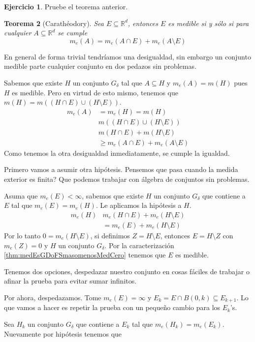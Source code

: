 \documentclass[12pt]{article}
\theoremstyle{plain}
\newtheorem{Th}{Teorema}[subsection]   %
\theoremstyle{definition}
\newtheorem{Ej}[Th]{Ejercicio}
\theoremstyle{remark}
\numberwithin{equation}{section}
\newcommand{\bR}{\mathbb{R}}        %
\renewcommand{\geq}{\geqslant}      %
\renewcommand{\:}{\colon}           %
\begin{document}
\begin{multicols}{2}
\begin{Ej}
  Pruebe el teorema anterior.
\end{Ej}

\begin{Th}[Carathéodory]
  Sea $E\subseteq\bR^d$, entonces $E$ es medible si y sólo si para cualquier $A\subseteq\bR^d$ se cumple
  $$m_e(A)=m_e(A\cap E)+m_e(A\setminus E)$$
\end{Th}
En general de forma trivial tendríamos una desigualdad, sin embargo un conjunto medible parte cualquier conjunto en dos pedazos sin problemas.

\begin{ptcbp}
Sabemos que existe $H$ un conjunto $G_\delta$ tal que $A\subseteq H$ y $m_e(A)=m(H)$ pues $H$ es medible. Pero en virtud de esto mismo, tenemos que $m(H)=m((H\cap E)\cup (H\setminus E))$.
\begin{align*}
  m_e(A) &=m_e(H)=m(H)\\
  &m((H\cap E)\cup (H\setminus E))\\
  &m(H\cap E)+m(H\setminus E)\\
  &\geq m_e(A\cap E)+m_e(A\setminus E)
\end{align*}
Como tenemos la otra desigualdad inmediatamente, se cumple la igualdad.\par
Primero vamos a asumir otra hipótesis. Pensemos que pasa cuando la medida exterior es finita? Que podemos trabajar con álgebra de conjuntos sin problemas.\par
Asuma que $m_e(E)<\infty$, sabemos que existe $H$ un conjunto $G_\delta$ que contiene a $E$ tal que $m_e(E)=m_e(H)$. Le aplicamos la hipótesis a $H$.
\begin{align*}
  m_e(H) & m_e(H\cap E)+m_e(H\setminus E)\\
  &= m_e(E)+m_e(H\setminus E)
\end{align*}
Por lo tanto $0=m_e(H\setminus E)$, si definimos $Z=H\setminus E$, entonces $E=H\setminus Z$ con $m_e(Z)=0$ y $H$ un conjunto $G_\delta$. Por la caracterización \ref{thm:medEsGDoFSmasomenosMedCero} tenemos que $E$ es medible.\par
Tenemos dos opciones, despedazar nuestro conjunto en cosas fáciles de trabajar o afinar la prueba para evitar sumar infinitos.\par
Por ahora, despedazamos. Tome $m_e(E)=\infty$ y $E_k=E\cap B(0,k)\subseteq E_{k+1}$. Lo que vamos a hacer es repetir la prueba con un pequeño cambio para los $E_k$'s. \par
Sea $H_k$ un conjunto $G_\delta$ que contiene a $E_k$ tal que $m_e(H_k)=m_e(E_k)$. Nuevamente por hipótesis tenemos que

\end{ptcbp}
\end{multicols}
\end{document}
